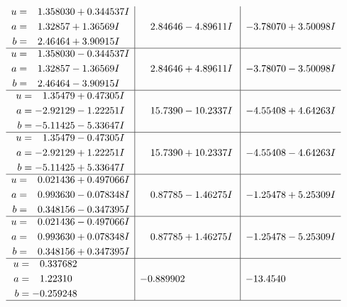\documentclass[1p]{elsarticle_modified}
\theoremstyle{definition}
\begin{document}
$$\begin{array}{c|c|c}
\begin{aligned}
u &= \phantom{-}1.358030 + 0.344537 I \\
a &= \phantom{-}1.32857 + 1.36569 I \\
b &= \phantom{-}2.46464 + 3.90915 I\end{aligned}
 & \phantom{-}2.84646 - 4.89611 I & -3.78070 + 3.50098 I \\ \hline\begin{aligned}
u &= \phantom{-}1.358030 - 0.344537 I \\
a &= \phantom{-}1.32857 - 1.36569 I \\
b &= \phantom{-}2.46464 - 3.90915 I\end{aligned}
 & \phantom{-}2.84646 + 4.89611 I & -3.78070 - 3.50098 I \\ \hline\begin{aligned}
u &= \phantom{-}1.35479 + 0.47305 I \\
a &= -2.92129 - 1.22251 I \\
b &= -5.11425 - 5.33647 I\end{aligned}
 & \phantom{-}15.7390 - 10.2337 I & -4.55408 + 4.64263 I \\ \hline\begin{aligned}
u &= \phantom{-}1.35479 - 0.47305 I \\
a &= -2.92129 + 1.22251 I \\
b &= -5.11425 + 5.33647 I\end{aligned}
 & \phantom{-}15.7390 + 10.2337 I & -4.55408 - 4.64263 I \\ \hline\begin{aligned}
u &= \phantom{-}0.021436 + 0.497066 I \\
a &= \phantom{-}0.993630 - 0.078348 I \\
b &= \phantom{-}0.348156 - 0.347395 I\end{aligned}
 & \phantom{-}0.87785 - 1.46275 I & -1.25478 + 5.25309 I \\ \hline\begin{aligned}
u &= \phantom{-}0.021436 - 0.497066 I \\
a &= \phantom{-}0.993630 + 0.078348 I \\
b &= \phantom{-}0.348156 + 0.347395 I\end{aligned}
 & \phantom{-}0.87785 + 1.46275 I & -1.25478 - 5.25309 I \\ \hline\begin{aligned}
u &= \phantom{-}0.337682\phantom{ +0.000000I} \\
a &= \phantom{-}1.22310\phantom{ +0.000000I} \\
b &= -0.259248\phantom{ +0.000000I}\end{aligned}
 & -0.889902\phantom{ +0.000000I} & -13.4540\phantom{ +0.000000I}\\
 \hline 
 \end{array}$$\newpage\newpage\renewcommand{\arraystretch}{1}
\end{document}
